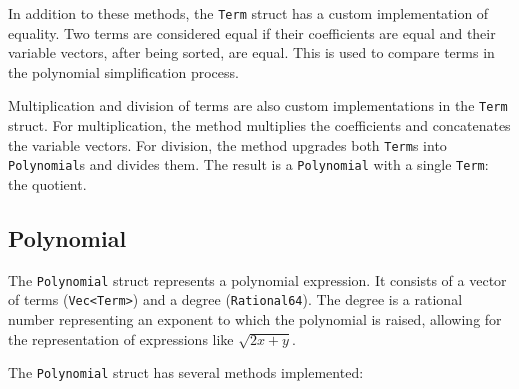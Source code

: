 In addition to these methods, the \verb|Term| struct has a custom implementation of equality. Two terms are considered equal if their coefficients are equal and their variable vectors, after being sorted, are equal. This is used to compare terms in the polynomial simplification process.

Multiplication and division of terms are also custom implementations in the \verb|Term| struct. For multiplication, the method multiplies the coefficients and concatenates the variable vectors. For division, the method upgrades both \verb|Term|s into \verb|Polynomial|s and divides them. The result is a \verb|Polynomial| with a single \verb|Term|: the quotient.

\subsection{Polynomial}\label{subsec:polynomial}

The \verb|Polynomial| struct represents a polynomial expression. It consists of a vector of terms (\verb|Vec<Term>|) and a degree (\verb|Rational64|). The degree is a rational number representing an exponent to which the polynomial is raised, allowing for the representation of expressions like $\sqrt{2x + y}$.

The \verb|Polynomial| struct has several methods implemented:

